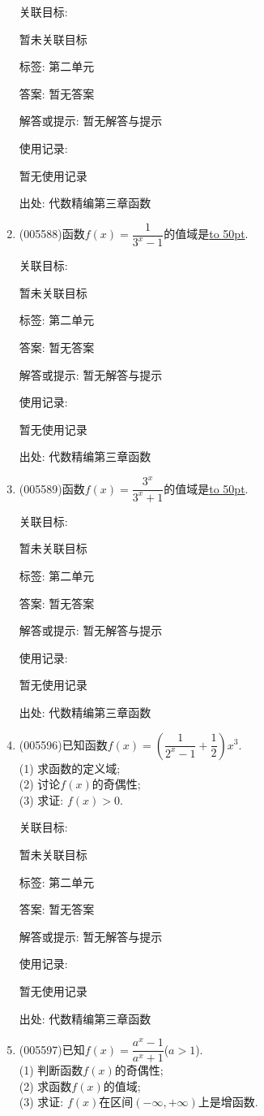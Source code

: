 \documentclass[10pt,a4paper]{article}
\newcommand{\blank}[1]{\underline{\hbox to #1pt{}}}
\begin{document}
\begin{enumerate}[1.]
关联目标:

暂未关联目标



标签: 第二单元

答案: 暂无答案

解答或提示: 暂无解答与提示

使用记录:

暂无使用记录


出处: 代数精编第三章函数
\item { (005588)}函数$f(x)=\dfrac 1{3^x-1}$的值域是\blank{50}.


关联目标:

暂未关联目标



标签: 第二单元

答案: 暂无答案

解答或提示: 暂无解答与提示

使用记录:

暂无使用记录


出处: 代数精编第三章函数
\item { (005589)}函数$f(x)=\dfrac{3^x}{3^x+1}$的值域是\blank{50}.


关联目标:

暂未关联目标



标签: 第二单元

答案: 暂无答案

解答或提示: 暂无解答与提示

使用记录:

暂无使用记录


出处: 代数精编第三章函数
\item { (005596)}已知函数$f(x)=(\dfrac 1{2^x-1}+\dfrac 12)x^3$.\\
(1) 求函数的定义域;\\
(2) 讨论$f(x)$的奇偶性;\\
(3) 求证: $f(x)>0$.


关联目标:

暂未关联目标



标签: 第二单元

答案: 暂无答案

解答或提示: 暂无解答与提示

使用记录:

暂无使用记录


出处: 代数精编第三章函数
\item { (005597)}已知$f(x)=\dfrac{a^x-1}{a^x+1}$($a>1$).\\
(1) 判断函数$f(x)$的奇偶性;\\
(2) 求函数$f(x)$的值域;\\
(3) 求证: $f(x)$在区间$(-\infty ,+\infty)$上是增函数.



\end{enumerate}
\end{document}
